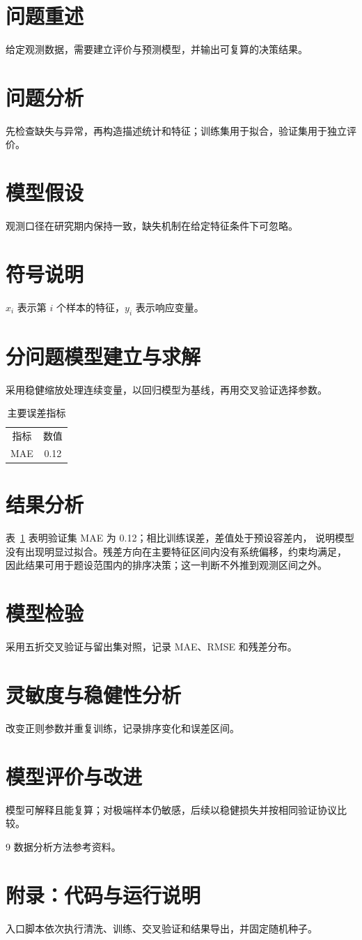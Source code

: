 \documentclass{ctexart}
\begin{document}
\begin{abstract}
针对数据决策问题，本文完成数据清洗、特征构造、预测和交叉验证，并报告误差。
\end{abstract}
\section{问题重述}
给定观测数据，需要建立评价与预测模型，并输出可复算的决策结果。
\section{问题分析}
先检查缺失与异常，再构造描述统计和特征；训练集用于拟合，验证集用于独立评价。
\section{模型假设}
观测口径在研究期内保持一致，缺失机制在给定特征条件下可忽略。
\section{符号说明}
$x_i$ 表示第 $i$ 个样本的特征，$y_i$ 表示响应变量。
\section{分问题模型建立与求解}
采用稳健缩放处理连续变量，以回归模型为基线，再用交叉验证选择参数。
\begin{table}[htbp]
\centering
\caption{主要误差指标}
\label{tab:metric}
\begin{tabular}{cc}指标&数值\\MAE&0.12\end{tabular}
\end{table}
\section{结果分析}
表~\ref{tab:metric} 表明验证集 MAE 为 0.12；相比训练误差，差值处于预设容差内，
说明模型没有出现明显过拟合。残差方向在主要特征区间内没有系统偏移，约束均满足，
因此结果可用于题设范围内的排序决策；这一判断不外推到观测区间之外。
\section{模型检验}
采用五折交叉验证与留出集对照，记录 MAE、RMSE 和残差分布。
\section{灵敏度与稳健性分析}
改变正则参数并重复训练，记录排序变化和误差区间。
\section{模型评价与改进}
模型可解释且能复算；对极端样本仍敏感，后续以稳健损失并按相同验证协议比较。
\begin{thebibliography}{9}
 数据分析方法参考资料。
\end{thebibliography}
\appendix
\section{附录：代码与运行说明}
入口脚本依次执行清洗、训练、交叉验证和结果导出，并固定随机种子。
\end{document}
